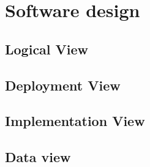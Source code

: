 \chapter{Software design}

\section{Logical View}


\clearpage

\section{Deployment View}


\clearpage

\section{Implementation View}


\clearpage

\section{Data view}

